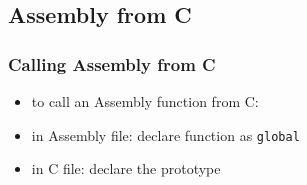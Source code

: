 \documentclass[dvipsnames]{beamer}
\begin{document}
\subsection{Assembly from C}

\begin{frame}
  \frametitle{Calling Assembly from C}

  \begin{itemize}
    \item to call an Assembly function from C:

    \medskip
    \item in Assembly file: declare function as \lstinline|global|
    \item in C file: declare the prototype
  \end{itemize}
\end{frame}
\end{document}
